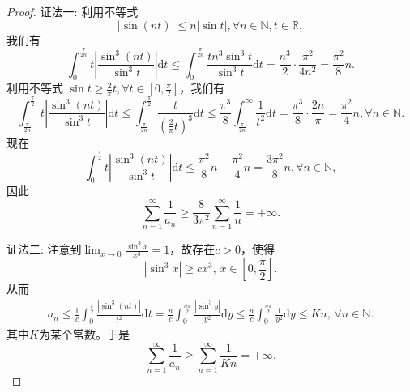\documentclass[../../main.tex]{subfiles}%
\begin{document}
\begin{proof}

{\color{blue}证法一:}
利用不等式
\[
|\sin (nt)| \leqslant n |\sin t|, \forall n \in \mathbb{N}, t \in \mathbb{R},
\]
我们有
\[
\int_{0}^{\frac{\pi}{2n}} t \left| \frac{\sin^3 (nt)}{\sin^3 t} \right| \mathrm{d}t \leqslant \int_{0}^{\frac{\pi}{2n}} \frac{t n^3 \sin^3 t}{\sin^3 t} \mathrm{d}t = \frac{n^3}{2} \cdot \frac{\pi^2}{4n^2} = \frac{\pi^2}{8} n.
\]
利用不等式 \( \sin t \geqslant \frac{2}{\pi} t, \forall t \in \left[ 0, \frac{\pi}{2} \right] \)，我们有
\[
\int_{\frac{\pi}{2n}}^{\frac{\pi}{2}} t \left| \frac{\sin^3 (nt)}{\sin^3 t} \right| \mathrm{d}t \leqslant \int_{\frac{\pi}{2n}}^{\frac{\pi}{2}} \frac{t}{\left( \frac{2}{\pi} t \right)^3} \mathrm{d}t \leqslant \frac{\pi^3}{8} \int_{\frac{\pi}{2n}}^{\infty} \frac{1}{t^2} \mathrm{d}t = \frac{\pi^3}{8} \cdot \frac{2n}{\pi} = \frac{\pi^2}{4} n, \forall n \in \mathbb{N}.
\]
现在
\[
\int_{0}^{\frac{\pi}{2}} t \left| \frac{\sin^3 (nt)}{\sin^3 t} \right| \mathrm{d}t \leqslant \frac{\pi^2}{8} n + \frac{\pi^2}{4} n = \frac{3\pi^2}{8} n, \forall n \in \mathbb{N},
\]
因此
\[
\sum_{n = 1}^{\infty} \frac{1}{a_n} \geqslant \frac{8}{3\pi^2} \sum_{n = 1}^{\infty} \frac{1}{n} = +\infty.
\]

{\color{blue}证法二:}
注意到$\lim_{x\rightarrow 0}\frac{\sin ^3x}{x^3}=1$，故存在$c>0$，使得
\[
|\sin^3 x| \geqslant c x^3, \, x \in \left[ 0, \frac{\pi}{2} \right].
\]
从而
\begin{align*}
a_n \leqslant \frac{1}{c} \int_0^{\frac{\pi}{2}} \frac{|\sin^3 (nt)|}{t^2} \mathrm{d}t = \frac{n}{c} \int_0^{\frac{n\pi}{2}} \frac{|\sin^3 y|}{y^2} \mathrm{d}y \leqslant \frac{n}{c} \int_0^{\frac{n\pi}{2}} \frac{1}{y^2} \mathrm{d}y \leqslant Kn, \, \forall n \in \mathbb{N}.
\end{align*}
其中$K$为某个常数。于是
\[
\sum_{n=1}^{\infty} \frac{1}{a_n} \geqslant \sum_{n=1}^{\infty} \frac{1}{Kn} = +\infty.
\]

\end{proof}
\end{document}

